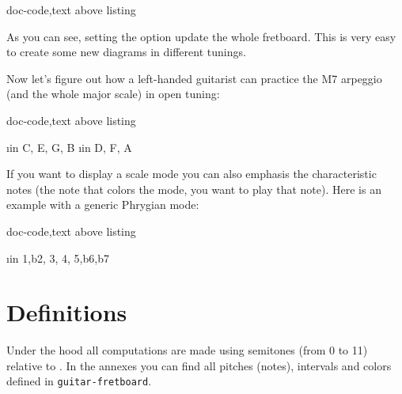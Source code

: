 \documentclass[a4paper]{article}
\newcommand{\pkg}[1]{\texttt{#1}}
\begin{document}
\begin{tcblisting}{doc-code,text above listing}
  \begin{fb}[frets min = 0, frets max = 3,
      chord, tuning = \tuning{guitar/open g},
      legend = {\pC Chord (open \pG)},
      fret numbers, scale=0.35]
      
  \end{fb}
\end{tcblisting}

As you can see, setting the  option update the whole
fretboard. This is very easy to create some new diagrams in different
tunings.

Now let's figure out how a left-handed guitarist can practice the \pC\unskip{}M7
arpeggio (and the whole major scale) in open \pG tuning:

\begin{tcblisting}{doc-code,text above listing}
  \begin{fb}[frets before = 2, frets after = 2,
      tuning = \tuning{guitar/open g}, left handed,
      legend = {\pC\unskip{}M7 arpeggio in open \pG tuning},
      fret numbers, scale=0.35]
    \foreach \i in {C, E, G, B} {
      \note{\i}
    }
    \foreach \i in {D, F, A} {
      \note[shade]{\i}
    }
  \end{fb}
\end{tcblisting}


If you want to display a scale mode you can also emphasis the characteristic
notes (the note that colors the mode, you want to play that note). Here is
an example with a generic Phrygian mode:

\begin{tcblisting}{doc-code,text above listing}
  \begin{fb}[frets min=2, frets max=6,
      transpose = -5,
      legend = {Phrygian scale}, scale=0.35]
    \foreach \i in {1,b2, 3, 4, 5,b6,b7} {
      \note{\i}
    }
  \end{fb}
\end{tcblisting}

\fi


\section{Definitions}

Under the hood all computations are made using semitones (from 0 to 11)
relative to \pC. In the annexes you can find all pitches (notes), intervals
and colors defined in \pkg{guitar-fretboard}.
\end{document}
